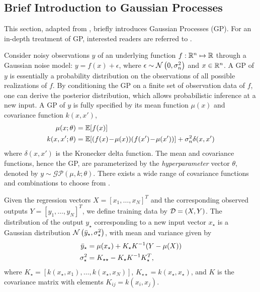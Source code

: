 
\subsection{Brief Introduction to Gaussian Processes}
\label{sec:modeling:gp}


This section, adapted from , briefly introduces Gaussian Processes (GP).
For an in-depth treatment of GP, interested readers are referred to \cite{Rasmussen2006}.


Consider noisy observations \(y\) of an underlying function \(f: \mathbb{R}^n \mapsto \mathbb{R}\) through a Gaussian noise model: \(y = f(x) + \epsilon\), where \(\epsilon \sim \operatorname*{\mathcal{N}}\left(0, \sigma_n^2\right)\) and  \(x \in \mathbb{R}^n\).
A GP of $y$ is essentially a probability distribution on the observations of all possible realizations of $f$.
By conditioning the GP on a finite set of observation data of $f$, one can derive the posterior distribution, which allows probabilistic inference at a new input.
%
A GP of \(y\) is fully specified by its mean function \(\mu(x)\) and covariance function \(k(x,x')\),
\begin{align*}
\label{E:gp:prior}
\mu(x; \theta) &= \mathbb{E} [f(x)] \\
k(x,x'; \theta) &= \mathbb{E} [(f(x)\!-\!\mu(x)) (f(x') \!-\! \mu(x'))] + \sigma_n^2 \delta(x,x') \nonumber
\end{align*}
where \(\delta(x,x')\) is the Kronecker delta function.
The mean and covariance functions, hence the GP, are parameterized by the \emph{hyperparameter} vector \(\theta\), denoted by \(y \sim \mathcal{GP}(\mu, k; \theta)\).
There exists a wide range of covariance functions and combinations to choose from \cite{Rasmussen2006}.

Given the regression vectors \(X = [x_1, \dots, x_N]^T\) and the corresponding observed outputs \(Y = [y_1, \dots, y_N]^T\), we define training data by $\mathcal{D} = (X, Y)$. The distribution of the output \(y_\star\) corresponding to a new input vector \(x_\star\) is a Gaussian distribution \(\operatorname*{\mathcal{N}}\left(\bar{y}_\star, \sigma_\star^2\right)\), with mean and variance given by
\begin{subequations}
\label{E:gp-regression}
\begin{align*}
\bar{y}_\star &= \mu(x_\star) + K_\star K^{-1} (Y - \mu(X))\\
\sigma_\star^2 &= K_{\star \star} - K_\star K^{-1} K_\star^T \text,
\end{align*}
\end{subequations}
where \(K_\star = [k(x_\star, x_1), \dots, k(x_\star, x_N)]\), \(K_{\star \star} = k(x_\star, x_\star)\), and $K$ is the covariance matrix with elements \(K_{ij} = k(x_i, x_j)\).

